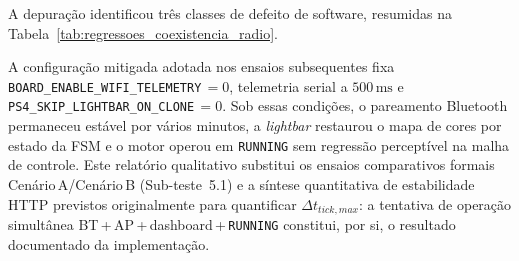 A depuração identificou três classes de defeito de software, resumidas na Tabela~\ref{tab:regressoes_coexistencia_radio}.

\begin{table}[H]
    \centering
    \caption{Regressões de firmware na coexistência Bluetooth, Wi-Fi AP e \texttt{RUNNING}.}
    \label{tab:regressoes_coexistencia_radio}
\end{table}


A configuração mitigada adotada nos ensaios subsequentes fixa \texttt{BOARD\_ENABLE\_WIFI\_TELEMETRY}\,$= 0$, telemetria serial a $500\,\text{ms}$ e \texttt{PS4\_SKIP\_LIGHTBAR\_ON\_CLONE}\,$= 0$. Sob essas condições, o pareamento Bluetooth permaneceu estável por vários minutos, a \textit{lightbar} restaurou o mapa de cores por estado da FSM e o motor operou em \texttt{RUNNING} sem regressão perceptível na malha de controle. Este relatório qualitativo substitui os ensaios comparativos formais Cenário\,A/Cenário\,B (Sub-teste~5.1) e a síntese quantitativa de estabilidade HTTP previstos originalmente para quantificar $\Delta t_{tick,max}$: a tentativa de operação simultânea BT\,+\,AP\,+\,dashboard\,+\,\texttt{RUNNING} constitui, por si, o resultado documentado da implementação.

